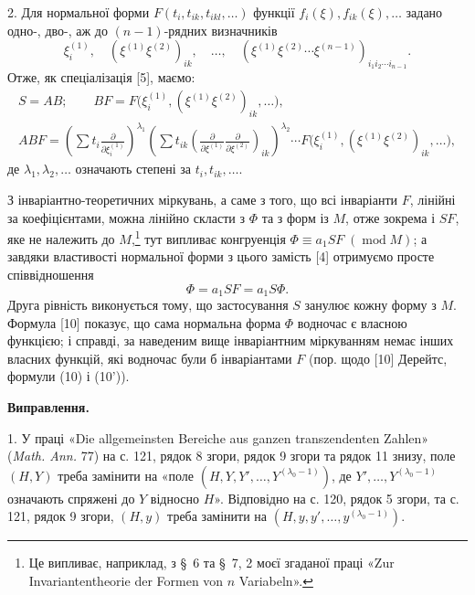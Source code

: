 \documentclass[11pt]{article}
\providecommand{\p}{\partial}
\providecommand{\modu}[1]{\;(\operatorname{mod} #1)}
\begin{document}
2. Для нормальної форми \(F(t_i,t_{ik},t_{ikl},\ldots)\) функції \(f_i(\xi),f_{ik}(\xi),\ldots\) задано одно-, дво-, аж до \((n-1)\)-рядних визначників
\[
        \xi_i^{(1)},\quad (\xi^{(1)}\xi^{(2)})_{ik},\quad\ldots,\quad
        (\xi^{(1)}\xi^{(2)}\cdots\xi^{(n-1)})_{i_1i_2\cdots i_{n-1}}.
\]
Отже, як спеціалізація [5], маємо:
\[
\begin{gathered}
        S=AB;\qquad
        BF=F\bigl(\xi_i^{(1)},(\xi^{(1)}\xi^{(2)})_{ik},\ldots\bigr),\\
        ABF=\left(\sum t_i\frac{\p}{\p\xi_i^{(1)}}\right)^{\lambda_1}
        \left(\sum t_{ik}\left(\frac{\p}{\p\xi^{(1)}}\frac{\p}{\p\xi^{(2)}}\right)_{ik}\right)^{\lambda_2}
        \cdots F\bigl(\xi_i^{(1)},(\xi^{(1)}\xi^{(2)})_{ik},\ldots\bigr),
\end{gathered}
\]
де \(\lambda_1,\lambda_2,\ldots\) означають степені за \(t_i,t_{ik},\ldots\).

З інваріантно-теоретичних міркувань, а саме з того, що всі інваріанти \(F\), лінійні за коефіцієнтами, можна лінійно скласти з \(\Phi\) та з форм із \(M\), отже зокрема і \(SF\), яке не належить до \(M\),\footnote{Це випливає, наприклад, з \S~6 та \S~7, 2 моєї згаданої праці «Zur Invariantentheorie der Formen von \(n\) Variabeln».} тут випливає конгруенція \(\Phi\equiv a_1SF\modu{M}\); а завдяки властивості нормальної форми з цього замість [4] отримуємо просте співвідношення
\begin{equation}
        \Phi=a_1SF=a_1S\Phi.
\tag{10}
\end{equation}
Друга рівність виконується тому, що застосування \(S\) занулює кожну форму з \(M\). Формула [10] показує, що сама нормальна форма \(\Phi\) водночас є власною функцією; і справді, за наведеним вище інваріантним міркуванням немає інших власних функцій, які водночас були б інваріантами \(F\) (пор. щодо [10] Дерейтс, формули (10) і (10')).

\begin{center}
\textbf{Виправлення.}
\end{center}

1. У праці «Die allgemeinsten Bereiche aus ganzen transzendenten Zahlen» (\emph{Math. Ann.} 77) на с. 121, рядок 8 згори, рядок 9 згори та рядок 11 знизу, поле \((H,Y)\) треба замінити на «поле \((H,Y,Y',\ldots,Y^{(\lambda_0-1)})\), де \(Y',\ldots,Y^{(\lambda_0-1)}\) означають спряжені до \(Y\) відносно \(H\)». Відповідно на с. 120, рядок 5 згори, та с. 121, рядок 9 згори, \((H,y)\) треба замінити на \((H,y,y',\ldots,y^{(\lambda_0-1)})\).
\end{document}
